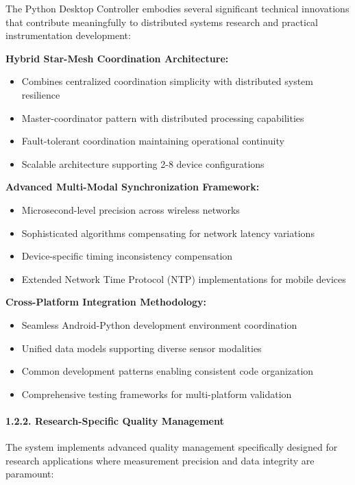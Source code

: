 \documentclass[12pt,a4paper]{article}
\begin{document}
The Python Desktop Controller embodies several significant technical innovations that contribute meaningfully to
distributed systems research and practical instrumentation development:

\textbf{Hybrid Star-Mesh Coordination Architecture:}

\begin{itemize}
\item Combines centralized coordination simplicity with distributed system resilience
\item Master-coordinator pattern with distributed processing capabilities
\item Fault-tolerant coordination maintaining operational continuity
\item Scalable architecture supporting 2-8 device configurations

\end{itemize}
\textbf{Advanced Multi-Modal Synchronization Framework:}

\begin{itemize}
\item Microsecond-level precision across wireless networks
\item Sophisticated algorithms compensating for network latency variations
\item Device-specific timing inconsistency compensation
\item Extended Network Time Protocol (NTP) implementations for mobile devices

\end{itemize}
\textbf{Cross-Platform Integration Methodology:}

\begin{itemize}
\item Seamless Android-Python development environment coordination
\item Unified data models supporting diverse sensor modalities
\item Common development patterns enabling consistent code organization
\item Comprehensive testing frameworks for multi-platform validation

\end{itemize}
\paragraph{1.2.2. Research-Specific Quality Management}

The system implements advanced quality management specifically designed for research applications where measurement
precision and data integrity are paramount:
\end{document}
